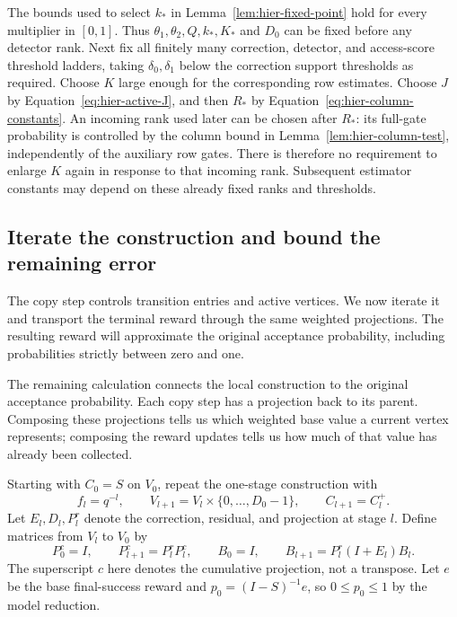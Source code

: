 \begin{remark}
\label{rem:hier-constant-order}
The bounds used to select $k_*$ in
Lemma~\ref{lem:hier-fixed-point} hold for every multiplier in $[0,1]$.
Thus $\theta_1,\theta_2,Q,k_*,K_*$ and $D_0$ can be fixed before any
detector rank.  Next fix all finitely many correction, detector, and
access-score threshold ladders, taking $\delta_0,\delta_1$ below the
correction support thresholds as required.  Choose $K$ large enough for
the corresponding row estimates.  Choose $J$ by
Equation~\eqref{eq:hier-active-J}, and then $R_*$ by
Equation~\eqref{eq:hier-column-constants}.  An incoming rank used later
can be chosen after $R_*$: its full-gate probability is controlled by
the column bound in Lemma~\ref{lem:hier-column-test}, independently of
the auxiliary row gates.  There is therefore no requirement to enlarge
$K$ again in response to that incoming rank.  Subsequent estimator
constants may depend on these already fixed ranks and thresholds.
\end{remark}

\subsection{Iterate the construction and bound the remaining error}

The copy step controls transition entries and active vertices.  We now
iterate it and transport the terminal reward through the same weighted
projections.  The resulting reward will approximate the original
acceptance probability, including probabilities strictly between zero
and one.

The remaining calculation connects the local construction to the original acceptance probability. Each copy step has a projection back to its parent. Composing these projections tells us which weighted base value a current vertex represents; composing the reward updates tells us how much of that value has already been collected.

Starting with $C_0=S$ on $V_0$, repeat the one-stage construction with
\[
 f_l=q^{-l},\qquad
 V_{l+1}=V_l\times\{0,\ldots,D_0-1\},\qquad C_{l+1}=C_l^+.
\]
Let $E_l,D_l,P_l^r$ denote the correction, residual, and projection at
stage $l$.  Define matrices from $V_l$ to $V_0$ by
\begin{equation}
 P_0^c=I,\qquad P_{l+1}^c=P_l^rP_l^c,
 \qquad B_0=I,\qquad B_{l+1}=P_l^r(I+E_l)B_l.
 \label{eq:hier-cumulative-matrices}
\end{equation}
The superscript $c$ here denotes the cumulative projection, not a
transpose.  Let $e$ be the base final-success reward and
$p_0=(I-S)^{-1}e$, so $0\leq p_0\leq1$ by the model reduction.

